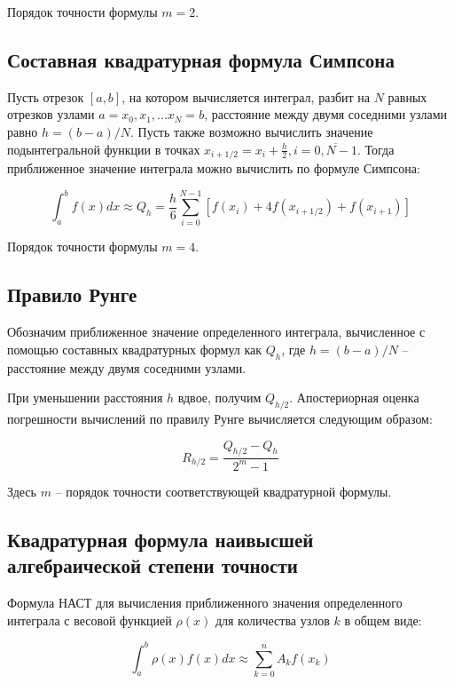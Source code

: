 \documentclass[12pt,a4paper]{article}
\begin{document}
Порядок точности формулы $m = 2$.

\subsection{Составная квадратурная формула Симпсона}

Пусть отрезок $[a,b]$, на котором вычисляется интеграл, разбит на $N$ равных отрезков узлами $a = x_0, x_1, ... x_N = b$, расстояние между двумя соседними узлами равно $h = (b - a)/N$. Пусть также возможно вычислить значение подынтегральной функции в точках $x_{i+1/2} = x_i + \frac{h}{2}, i = \overline{0,N-1}$. Тогда приближенное значение интеграла можно вычислить по формуле Симпсона:

\begin{equation}
\int_{a}^{b} f(x) dx \approx Q_h = \frac{h}{6} \sum_{i=0}^{N-1} \left[ f(x_i) + 4f(x_{i+1/2}) + f(x_{i+1}) \right]
\end{equation}

Порядок точности формулы $m = 4$.

\subsection{Правило Рунге}

Обозначим приближенное значение определенного интеграла, вычисленное с помощью составных квадратурных формул как $Q_h$, где $h = (b - a)/N$ – расстояние между двумя соседними узлами.

При уменьшении расстояния $h$ вдвое, получим $Q_{h/2}$. Апостериорная оценка погрешности вычислений по правилу Рунге вычисляется следующим образом:

\begin{equation}
R_{h/2} = \frac{Q_{h/2} - Q_h}{2^m - 1}
\end{equation}

Здесь $m$ – порядок точности соответствующей квадратурной формулы.

\subsection{Квадратурная формула наивысшей алгебраической степени точности}

Формула НАСТ для вычисления приближенного значения определенного интеграла с весовой функцией $\rho(x)$ для количества узлов $k$ в общем виде:

\begin{equation}
\int_{a}^{b} \rho(x)f(x) dx \approx \sum_{k=0}^{n} A_k f(x_k)
\end{equation}
\end{document}
